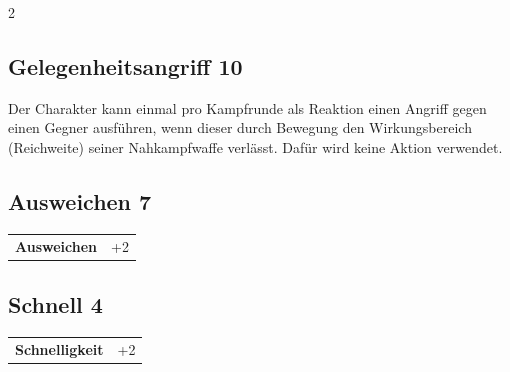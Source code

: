 \begin{multicols}{2}
\begin{tcolorbox}
\end{tcolorbox}

\begin{tcolorbox}
    \subsection*{Gelegenheitsangriff \hfill \small{10 }}
    \tcblower
Der Charakter kann einmal pro Kampfrunde als Reaktion einen Angriff gegen einen Gegner ausführen, wenn dieser durch Bewegung den Wirkungsbereich (Reichweite) seiner Nahkampfwaffe verlässt. Dafür wird keine Aktion verwendet.


\vspace{3mm}



\end{tcolorbox}

\begin{tcolorbox}
    \subsection*{Ausweichen \hfill \small{7 }}
    \tcblower




\begin{tabular}{@{}ll@{}}
    \textbf{Ausweichen} & +2\\
\end{tabular}


\end{tcolorbox}

\begin{tcolorbox}
    \subsection*{Schnell \hfill \small{4 }}
    \tcblower




\begin{tabular}{@{}ll@{}}
    \textbf{Schnelligkeit} & +2\\
\end{tabular}



\end{tcolorbox}
\end{multicols}
